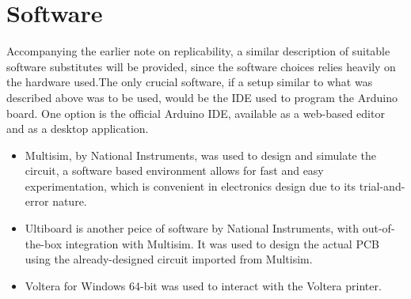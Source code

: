 \section{Software}
Accompanying the earlier note on replicability, a similar description of suitable software substitutes will be provided, since the software choices relies heavily on the hardware used.\quad The only crucial software, if a setup similar to what was described above was to be used, would be the IDE used to program the Arduino board. One option is the official Arduino IDE, available as a web-based editor and as a desktop application\cite{arduino}.
\begin{itemize}
    \item Multisim\cite{multisim}, by National Instruments, was used to design and simulate the circuit, a software based environment allows for fast and easy experimentation, which is convenient in electronics design due to its trial-and-error nature.
    \item Ultiboard is another peice of software by National Instruments, with out-of-the-box integration with Multisim. It was used to design the actual PCB using the already-designed circuit imported from Multisim.
    \item Voltera for Windows 64-bit was used to interact with the Voltera printer.
\end{itemize}
